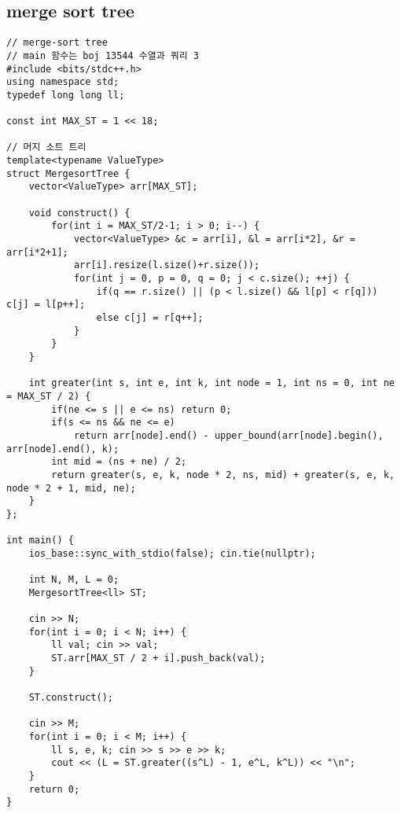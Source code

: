 \documentclass[landscape, 8pt, a4paper, oneside, twocolumn]{extarticle}
\begin{document}
    \subsection{merge sort tree}
    \begin{verbatim}
// merge-sort tree
// main 함수는 boj 13544 수열과 쿼리 3
#include <bits/stdc++.h>
using namespace std;
typedef long long ll;

const int MAX_ST = 1 << 18;

// 머지 소트 트리
template<typename ValueType>
struct MergesortTree {
    vector<ValueType> arr[MAX_ST];

    void construct() {
        for(int i = MAX_ST/2-1; i > 0; i--) {
            vector<ValueType> &c = arr[i], &l = arr[i*2], &r = arr[i*2+1];
            arr[i].resize(l.size()+r.size());
            for(int j = 0, p = 0, q = 0; j < c.size(); ++j) {
                if(q == r.size() || (p < l.size() && l[p] < r[q])) c[j] = l[p++];
                else c[j] = r[q++];
            }
        }
    }

    int greater(int s, int e, int k, int node = 1, int ns = 0, int ne = MAX_ST / 2) {
        if(ne <= s || e <= ns) return 0;
        if(s <= ns && ne <= e)
            return arr[node].end() - upper_bound(arr[node].begin(), arr[node].end(), k);
        int mid = (ns + ne) / 2;
        return greater(s, e, k, node * 2, ns, mid) + greater(s, e, k, node * 2 + 1, mid, ne);
    }
};

int main() {
    ios_base::sync_with_stdio(false); cin.tie(nullptr);

    int N, M, L = 0;
    MergesortTree<ll> ST;

    cin >> N;
    for(int i = 0; i < N; i++) {
        ll val; cin >> val;
        ST.arr[MAX_ST / 2 + i].push_back(val);
    }

    ST.construct();

    cin >> M;
    for(int i = 0; i < M; i++) {
        ll s, e, k; cin >> s >> e >> k;
        cout << (L = ST.greater((s^L) - 1, e^L, k^L)) << "\n";
    }
    return 0;
}
    \end{verbatim}
\end{document}
